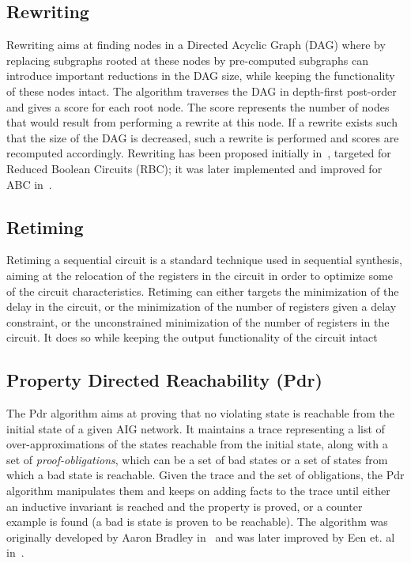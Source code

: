 \subsection{Rewriting}
Rewriting aims at finding nodes in a Directed Acyclic Graph (DAG) where by replacing subgraphs rooted 
at these nodes by pre-computed subgraphs can introduce important reductions in the DAG size, while 
keeping the functionality of these nodes intact. The algorithm traverses the DAG in depth-first post-order
and gives a score for each root node. The score represents the number of nodes that would result
from performing a rewrite at this node. If a rewrite exists such that the size of the DAG is decreased, such 
a rewrite is performed and scores are recomputed accordingly.  
Rewriting has been proposed initially in~\cite{bjesse2004dag}, targeted for Reduced Boolean Circuits (RBC); 
it was later implemented and improved for ABC in~\cite{mishchenko2006dag}. 

\subsection{Retiming}
Retiming a sequential circuit is a standard technique used in sequential synthesis, 
aiming at the relocation of the registers in the circuit in order to optimize 
some of the circuit characteristics. Retiming can either targets the minimization of the delay 
in the circuit, or the minimization of the number of registers given a delay constraint, 
or the unconstrained minimization of the number of registers in the circuit. It 
does so while keeping the output functionality of the circuit intact~\cite{hurst2007fast}

\subsection{Property Directed Reachability (Pdr)}
The Pdr algorithm aims at proving that no 
violating state is reachable from the initial state of a given AIG network. 
It maintains a trace representing a list of over-approximations of the states
reachable from the initial state, along with a set of {\em proof-obligations}, 
which can be a set of bad states or a set of states from which a bad state is
reachable. Given the trace and the set of obligations, the Pdr algorithm manipulates 
them and keeps on adding facts to the trace until either an inductive invariant 
is reached and the property is proved, or a counter example is found (a bad is state
is proven to be reachable). The algorithm was originally developed by Aaron Bradley 
in~\cite{bradley2011sat,bradley2007checking} and was later improved by Een et. al in~\cite{een2011efficient}.

